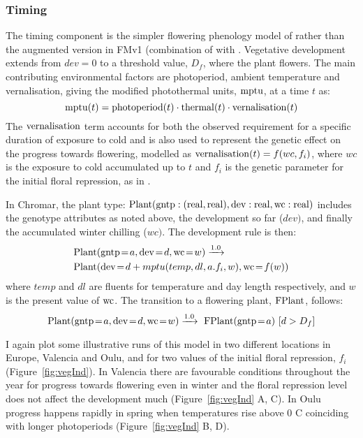 \subsubsection*{Timing}
\label{timing}

The timing component is the simpler flowering phenology model of
\citet{wilczek_effects_2009} rather than the augmented version in FMv1
(combination of \citet{chew_augmented_2012} with
\citet{salazar_prediction_2009}. Vegetative development extends from \(dev = 0\)
to a threshold value, \(D_{f}\), where the plant flowers. The main contributing
environmental factors are photoperiod, ambient temperature and vernalisation,
giving the modified photothermal units, \(\mathrm{mptu}\), at a time \(t\) as:
\[\mathrm{mptu}(t) = \mathrm{photoperiod}(t) \cdot \mathrm{thermal}(t) \cdot \mathrm{vernalisation}(t)\]
The \(\mathrm{vernalisation}\) term accounts for both the observed requirement for
a specific duration of exposure to cold and is also used to represent the
genetic effect on the progress towards flowering, modelled as
\(\mathrm{vernalisation}(t) = f(wc,f_{i})\), where $wc$ is the exposure to
cold accumulated up to \(t\) and \(f_{i}\) is the genetic parameter for the
initial floral repression, as in \citet{wilczek_effects_2009}.

In Chromar, the plant type:
\(\mathrm{Plant}(\mathrm{gntp}:(\mathrm{real},\mathrm{real}),\mathrm{dev}:\mathrm{real},\mathrm{wc}:\mathrm{real})\)
includes the genotype attributes as noted above, the development so far
(\(dev)\), and finally the accumulated winter chilling (\(wc)\). The
development rule is then:
\begin{equation*}
\begin{split}
&\mr{Plant}(\ar{gntp}{a},\ar{dev}{d}, \ar{wc}{w}) \xrightarrow{1.0} \\ 
&\mr{Plant}(\ar{dev}{d + mptu( temp, dl, a.f_{i}, w )},\ar{wc}{f(w)})
\end{split}
\end{equation*}
where $temp$ and $dl$ are fluents for temperature and day
length respectively, and $w$ is the present value of $\mathrm{wc}$. The transition to a
flowering plant, \(\mathrm{FPlant}\), follows:
$$
\mr{Plant}(\ar{gntp}{a}, \ar{dev}{d}, \ar{wc}{w}) \xrightarrow{1.0} \mr{\ FPlant}(\ar{gntp}{a}) \, \, \lbrack d > D_{f} \rbrack
$$

I again plot some illustrative runs of this model in two different locations in
Europe, Valencia and Oulu, and for two values of the initial floral repression,
$f_i$ (Figure~\ref{fig:vegInd}). In Valencia there are favourable conditions
throughout the year for progress towards flowering even in winter and the floral
repression level does not affect the development much (Figure~\ref{fig:vegInd}
A, C). In Oulu progress happens rapidly in spring when temperatures rise above 0
\textdegree C coinciding with longer photoperiods (Figure~\ref{fig:vegInd} B,
D).

